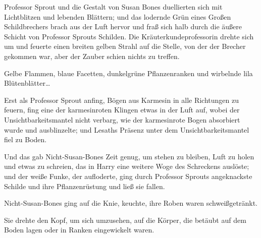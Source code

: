 Professor Sprout und die Gestalt von Susan Bones duellierten sich mit Lichtblitzen und lebenden Blättern; und das lodernde Grün eines Großen Schildbrechers brach aus der Luft hervor und fraß sich halb durch die äußere Schicht von Professor Sprouts Schilden. Die Kräuterkundeprofessorin drehte sich um und feuerte einen breiten gelben Strahl auf die Stelle, von der der Brecher gekommen war, aber der Zauber schien nichts zu treffen.

Gelbe Flammen, blaue Facetten, dunkelgrüne Pflanzenranken und wirbelnde lila Blütenblätter…

Erst als Professor Sprout anfing, Bögen aus Karmesin in alle Richtungen zu feuern, fing eine der karmesinroten Klingen etwas in der Luft auf, wobei der Unsichtbarkeitsmantel nicht verbarg, wie der karmesinrote Bogen absorbiert wurde und ausblinzelte; und Lesaths Präsenz unter dem Unsichtbarkeitsmantel fiel zu Boden.

Und das gab Nicht-Susan-Bones Zeit genug, um stehen zu bleiben, Luft zu holen und etwas zu schreien, das in Harry eine weitere Woge des Schreckens auslöste; und der weiße Funke, der aufloderte, ging durch Professor Sprouts angeknackste Schilde und ihre Pflanzenrüstung und ließ sie fallen.

Nicht-Susan-Bones ging auf die Knie, keuchte, ihre Roben waren schweißgetränkt.

Sie drehte den Kopf, um sich umzusehen, auf die Körper, die betäubt auf dem Boden lagen oder in Ranken eingewickelt waren.

